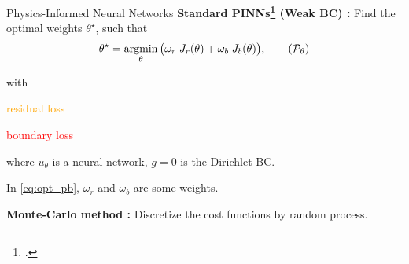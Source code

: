 
\begin{appendixframe}{Physics-Informed Neural Networks}
	\textbf{Standard PINNs\footcite{RAISSI2019686} (Weak BC) :} Find the optimal weights $\theta^\star$, such that
	\begin{equation}
		\label{eq:opt_pb}
		\theta^\star = \argmin_{\theta}	\big( \omega_r \; J_r(\theta) + \omega_b \; J_b(\theta) \big),
		\tag{$\mathcal{P}_\theta$}
	\end{equation}

	\vspace{-5pt}
	with
	\vspace{5pt}

	\begin{minipage}{0.2\linewidth}
		\flushright
		\textcolor{orange}{residual loss}

		\vspace{12pt}
		\textcolor{red}{boundary loss}
	\end{minipage}
	\begin{minipage}{0.68\linewidth}
		\centering
		
		\vspace{3pt}
	\end{minipage}
	
	\vspace{5pt}
	where $u_\theta$ is a neural network, $g=0$ is the Dirichlet BC. 

	\vspace{2pt}
	In \eqref{eq:opt_pb}, $\omega_r$ and $\omega_b$ are some weights.

	\vspace{5pt}
	\textbf{Monte-Carlo method :} Discretize the cost functions by random process.
	\vspace{15pt}
\end{appendixframe}


